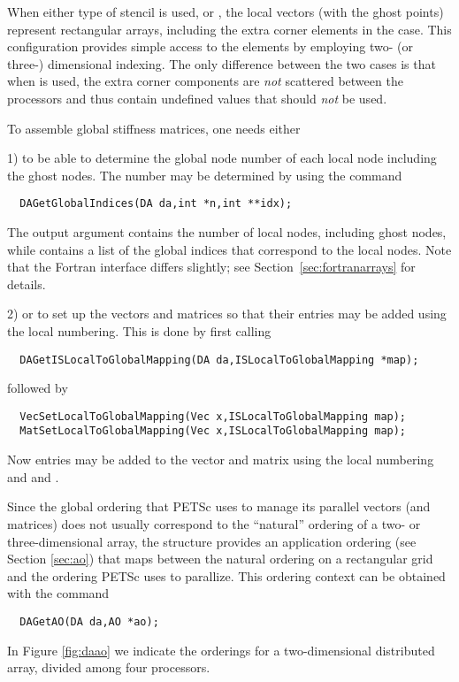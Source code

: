 When either type of stencil is used,  or 
, the local vectors (with the ghost points) 
represent rectangular arrays, including the extra corner elements in 
the  case. This configuration provides simple 
access to the elements by employing two- (or three-) dimensional indexing. 
The only difference between the 
two cases is that when  is used, the extra 
corner components are {\em not} scattered between the processors and thus
contain undefined values that should {\em not} be used.

To assemble global stiffness matrices, one needs either 

1) to be able to determine the global node number of each local node 
including the ghost nodes. The number may be determined by using the 
command 
\begin{verbatim}
  DAGetGlobalIndices(DA da,int *n,int **idx);
\end{verbatim}
The output argument  contains the number of 
local nodes, including ghost nodes, while  contains
a list of the global indices that correspond to the local nodes.
Note that the Fortran interface differs slightly; see Section~\ref{sec:fortranarrays}
for details.

2) or to set up the vectors and matrices so that their entries may be
added using the local numbering. This is done by first calling 
\begin{verbatim}
  DAGetISLocalToGlobalMapping(DA da,ISLocalToGlobalMapping *map);
\end{verbatim}
followed by 
\begin{verbatim}
  VecSetLocalToGlobalMapping(Vec x,ISLocalToGlobalMapping map);
  MatSetLocalToGlobalMapping(Vec x,ISLocalToGlobalMapping map);
\end{verbatim}
Now entries may be added to the vector and matrix using the local numbering
and  and .


Since the global ordering that PETSc uses to manage its parallel vectors 
(and matrices) does not usually correspond to the ``natural'' ordering 
of a two- or three-dimensional array, the  structure provides 
an application ordering  (see Section \ref{sec:ao}) that maps 
between the natural ordering on a rectangular grid and the ordering PETSc
uses to parallize. This ordering context can be obtained with the command
\begin{verbatim}
  DAGetAO(DA da,AO *ao);
\end{verbatim}
In Figure \ref{fig:daao} we indicate the orderings for a two-dimensional distributed 
array, divided among four processors.

